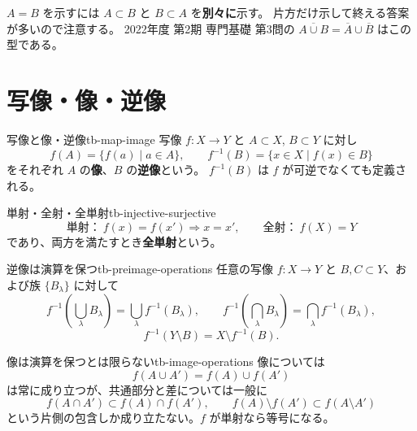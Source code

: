 $A=B$ を示すには $A\subset B$ と $B\subset A$ を\textbf{別々に}示す。
片方だけ示して終える答案が多いので注意する。
2022年度 第2期 専門基礎 第3問の $\overline{A\cup B}=\overline A\cup\overline B$ はこの型である。

\section{写像・像・逆像}

\begin{definition}{写像と像・逆像}{tb-map-image}
写像 $f:X\to Y$ と $A\subset X$, $B\subset Y$ に対し
\[
f(A)=\{f(a)\mid a\in A\},\qquad
f^{-1}(B)=\{x\in X\mid f(x)\in B\}
\]
をそれぞれ $A$ の\textbf{像}、$B$ の\textbf{逆像}という。
$f^{-1}(B)$ は $f$ が可逆でなくても定義される。
\end{definition}

\begin{definition}{単射・全射・全単射}{tb-injective-surjective}
\[
\text{単射：}\ f(x)=f(x')\Longrightarrow x=x',
\qquad
\text{全射：}\ f(X)=Y
\]
であり、両方を満たすとき\textbf{全単射}という。
\end{definition}

\begin{theorem}{逆像は演算を保つ}{tb-preimage-operations}
任意の写像 $f:X\to Y$ と $B,C\subset Y$、および族 $\{B_\lambda\}$ に対して
\[
f^{-1}\left(\bigcup_\lambda B_\lambda\right)=\bigcup_\lambda f^{-1}(B_\lambda),
\qquad
f^{-1}\left(\bigcap_\lambda B_\lambda\right)=\bigcap_\lambda f^{-1}(B_\lambda),
\]
\[
f^{-1}(Y\setminus B)=X\setminus f^{-1}(B).
\]
\end{theorem}

\begin{proposition}{像は演算を保つとは限らない}{tb-image-operations}
像については
\[
f(A\cup A')=f(A)\cup f(A')
\]
は常に成り立つが、共通部分と差については一般に
\[
f(A\cap A')\subset f(A)\cap f(A'),
\qquad
f(A)\setminus f(A')\subset f(A\setminus A')
\]
という片側の包含しか成り立たない。$f$ が単射なら等号になる。
\end{proposition}

